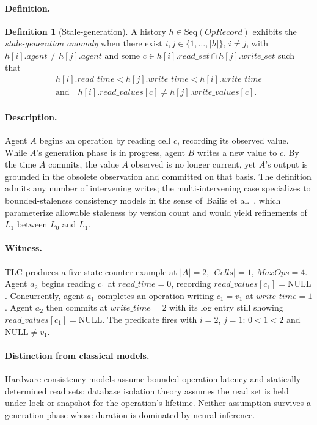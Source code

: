 \documentclass[journal,compsoc,10pt]{IEEEtran}
\theoremstyle{definition}
\newtheorem{anomaly}{Definition}
\theoremstyle{remark}
\newcommand{\fld}[1]{\mathit{#1}}
\newcommand{\rs}{\fld{read\_set}}
\newcommand{\ws}{\fld{write\_set}}
\newcommand{\rt}{\fld{read\_time}}
\newcommand{\wt}{\fld{write\_time}}
\newcommand{\rv}{\fld{read\_values}}
\newcommand{\wv}{\fld{write\_values}}
\begin{document}
\paragraph{Definition.}
\begin{anomaly}[Stale-generation]
\label{def:a1}
A history $h \in \mathrm{Seq}(\fld{OpRecord})$ exhibits the
\emph{stale-generation anomaly} when there exist
$i, j \in \{1,\ldots,|h|\}$, $i \neq j$, with
$h[i].\fld{agent} \neq h[j].\fld{agent}$ and some
$c \in h[i].\rs \cap h[j].\ws$ such that
\[
  \begin{gathered}
  h[i].\rt < h[j].\wt < h[i].\wt\\
  \text{and}\quad h[i].\rv[c] \neq h[j].\wv[c].
  \end{gathered}
\]
\end{anomaly}

\paragraph{Description.}
Agent $A$ begins an operation by reading cell $c$, recording its
observed value. While $A$'s generation phase is in progress, agent $B$
writes a new value to $c$. By the time $A$ commits, the value $A$
observed is no longer current, yet $A$'s output is grounded in the
obsolete observation and committed on that basis. The definition
admits any number of intervening writes; the multi-intervening case
specializes to bounded-staleness consistency models in the sense
of~Bailis et al.~\cite{BailisEtAl2012PBS}, which parameterize allowable staleness
by version count and would yield refinements of $L_1$ between $L_0$
and $L_1$.

\paragraph{Witness.}
TLC produces a five-state counter-example at $|A|=2$, $|\fld{Cells}|=1$,
$\fld{MaxOps}=4$. Agent $a_2$ begins reading $c_1$ at $\rt = 0$,
recording $\rv[c_1] = \mathrm{NULL}$. Concurrently, agent $a_1$
completes an operation writing $c_1 = v_1$ at $\wt = 1$. Agent $a_2$
then commits at $\wt = 2$ with its log entry still showing
$\rv[c_1] = \mathrm{NULL}$. The predicate fires with $i = 2$, $j = 1$:
$0 < 1 < 2$ and $\mathrm{NULL} \neq v_1$.

\paragraph{Distinction from classical models.}
Hardware consistency models assume bounded operation latency and
statically-determined read sets; database isolation theory assumes
the read set is held under lock or snapshot for the operation's
lifetime. Neither assumption survives a generation phase whose
duration is dominated by neural inference.
\end{document}
